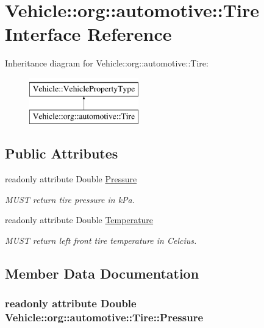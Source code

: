 \hypertarget{interfaceVehicle_1_1org_1_1automotive_1_1Tire}{\section{Vehicle\-:\-:org\-:\-:automotive\-:\-:Tire Interface Reference}
\label{interfaceVehicle_1_1org_1_1automotive_1_1Tire}
}
Inheritance diagram for Vehicle\-:\-:org\-:\-:automotive\-:\-:Tire\-:\begin{figure}[H]
\begin{center}
\leavevmode
\includegraphics[height=2.000000cm]{interfaceVehicle_1_1org_1_1automotive_1_1Tire}
\end{center}
\end{figure}
\subsection*{Public Attributes}
\begin{DoxyCompactItemize}
\item 
readonly attribute Double \hyperlink{interfaceVehicle_1_1org_1_1automotive_1_1Tire_a7f17b0bd4024d5667af4af3daf39fc22}{Pressure}
\begin{DoxyCompactList}\small\item\em M\-U\-S\-T return tire pressure in k\-Pa. \end{DoxyCompactList}\item 
readonly attribute Double \hyperlink{interfaceVehicle_1_1org_1_1automotive_1_1Tire_a869c96c8f2d1d472dba467f1ff8193b5}{Temperature}
\begin{DoxyCompactList}\small\item\em M\-U\-S\-T return left front tire temperature in Celcius. \end{DoxyCompactList}\end{DoxyCompactItemize}


\subsection{Member Data Documentation}
\hypertarget{interfaceVehicle_1_1org_1_1automotive_1_1Tire_a7f17b0bd4024d5667af4af3daf39fc22}{
\subsubsection[{Pressure}]{\setlength{\rightskip}{0pt plus 5cm}readonly attribute Double Vehicle\-::org\-::automotive\-::\-Tire\-::\-Pressure}}\label{interfaceVehicle_1_1org_1_1automotive_1_1Tire_a7f17b0bd4024d5667af4af3daf39fc22}


